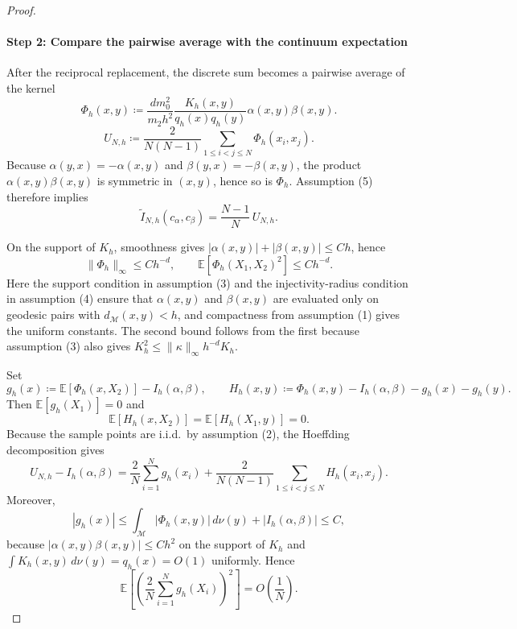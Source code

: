\documentclass[a4paper,11pt, DIV=10]{scrartcl}
\numberwithin{equation}{section}
\theoremstyle{definition}
\theoremstyle{remark}
\newcommand{\mc}[1]{\mathcal{#1}}
\begin{document}
\begin{proof}
\paragraph{Step 2: Compare the pairwise average with the continuum expectation}
After the reciprocal replacement, the discrete sum becomes a pairwise average of the kernel
\begin{equation}
\label{eq:def-Phi-h}
\Phi_h(x,y)
\coloneq
\frac{dm_0^2}{m_2h^2}
\frac{K_h(x,y)}{q_h(x)q_h(y)}
\alpha(x,y)\beta(x,y).
\end{equation}
\begin{equation}
\label{eq:def-U-N-h}
U_{N,h}
\coloneq
\frac{2}{N(N-1)}
\sum_{1\le i<j\le N}\Phi_h(x_i,x_j).
\end{equation}
Because $\alpha(y,x)=-\alpha(x,y)$ and $\beta(y,x)=-\beta(x,y)$, the product $\alpha(x,y)\beta(x,y)$ is symmetric in $(x,y)$, hence so is $\Phi_h$. Assumption \textup{(5)} therefore implies
\begin{equation}
\label{eq:Itilde-vs-U}
\widetilde I_{N,h}(c_\alpha,c_\beta)
=
\frac{N-1}{N}\,U_{N,h}.
\end{equation}

On the support of $K_h$, smoothness gives $|\alpha(x,y)|+|\beta(x,y)|\le Ch$, hence
\begin{equation}
\label{eq:phi-moments}
\|\Phi_h\|_\infty\le C h^{-d},
\qquad
\mathbb E[\Phi_h(X_1,X_2)^2]\le C h^{-d}.
\end{equation}
Here the support condition in assumption \textup{(3)} and the injectivity-radius condition in assumption \textup{(4)} ensure that $\alpha(x,y)$ and $\beta(x,y)$ are evaluated only on geodesic pairs with $d_{\mc{M}}(x,y)<h$, and compactness from assumption \textup{(1)} gives the uniform constants. The second bound follows from the first because assumption \textup{(3)} also gives $K_h^2\le \|\kappa\|_\infty h^{-d}K_h$.

Set
\begin{equation}
g_h(x)\coloneq \mathbb E[\Phi_h(x,X_2)]-I_h(\alpha,\beta),
\qquad
H_h(x,y)\coloneq \Phi_h(x,y)-I_h(\alpha,\beta)-g_h(x)-g_h(y).
\end{equation}
Then $\mathbb E[g_h(X_1)]=0$ and
\begin{equation}
\mathbb E[H_h(x,X_2)]=\mathbb E[H_h(X_1,y)]=0.
\end{equation}
Because the sample points are i.i.d.\ by assumption \textup{(2)}, the Hoeffding decomposition gives
\begin{equation}
\label{eq:hoeffding}
U_{N,h}-I_h(\alpha,\beta)
=
\frac{2}{N}\sum_{i=1}^N g_h(x_i)
+
\frac{2}{N(N-1)}
\sum_{1\le i<j\le N} H_h(x_i,x_j).
\end{equation}
Moreover,
\begin{equation}
|g_h(x)|
\le
\int_{\mc{M}}|\Phi_h(x,y)|\,d\nu(y)+|I_h(\alpha,\beta)|
\le C,
\end{equation}
because $|\alpha(x,y)\beta(x,y)|\le Ch^2$ on the support of $K_h$ and $\int K_h(x,y)\,d\nu(y)=q_h(x)=O(1)$ uniformly. Hence
\begin{equation}
\label{eq:linear-part-variance}
\mathbb E\!\left[
\left(
\frac{2}{N}\sum_{i=1}^N g_h(X_i)
\right)^2
\right]
=
O\!\left(\frac{1}{N}\right).
\end{equation}


\end{proof}
\end{document}
